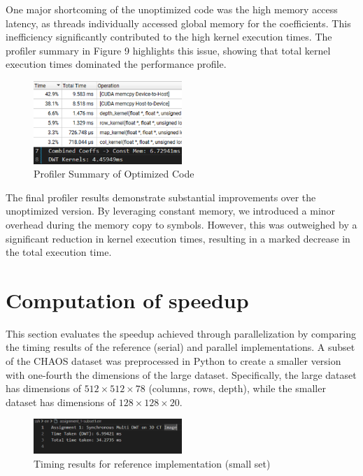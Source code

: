\documentclass[journal,11pt]{IEEEtran}
\begin{document}
One major shortcoming of the unoptimized code was the high memory access latency, as threads individually accessed global memory for the coefficients. This inefficiency significantly contributed to the high kernel execution times. The profiler summary in Figure 9 highlights this issue, showing that total kernel execution times dominated the performance profile.

\begin{figure}[h] 
    \centering 
    \includegraphics[width=0.5\textwidth]{assets/optim-sum.png} 
    \caption{Profiler Summary of Optimized Code} 
    \label{fig:12} 
\end{figure}

The final profiler results demonstrate substantial improvements over the unoptimized version. By leveraging constant memory, we introduced a minor overhead during the memory copy to symbols. However, this was outweighed by a significant reduction in kernel execution times, resulting in a marked decrease in the total execution time.

\section{Computation of speedup}

This section evaluates the speedup achieved through parallelization by comparing the timing results of the reference (serial) and parallel implementations. A subset of the CHAOS dataset was preprocessed in Python to create a smaller version with one-fourth the dimensions of the large dataset. Specifically, the large dataset has dimensions of \(512 \times 512 \times 78\) (columns, rows, depth), while the smaller dataset has dimensions of \(128 \times 128 \times 20\).


\begin{figure}[h]
    \centering
    \includegraphics[width=0.5\textwidth]{assets/1-subset.png}
    \caption{Timing results for reference implementation (small set)}
    \label{fig:13}
\end{figure}
\end{document}
